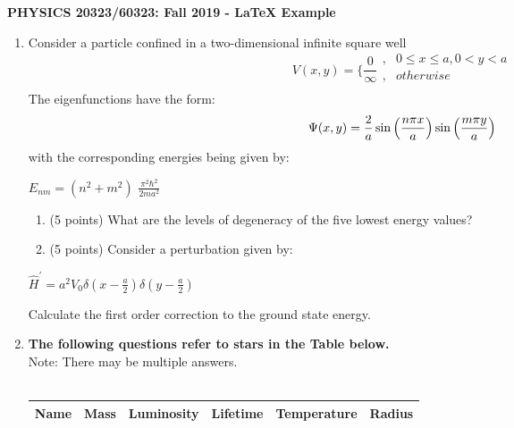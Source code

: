 \documentclass[12pt]{article}
\begin{document}
\def\pos{\medskip\quad}
\def\subpos{\smallskip \qquad}

\begin{center}
{\large\bf
PHYSICS  20323/60323: Fall 2019 - LaTeX Example}\\
\end{center}
\begin{enumerate}
\item {Consider a particle confined in a two-dimensional infinite square well}
\[V(x,y)= \bigg\{ \frac{0}{\infty}\begin{array}{cc}
    , & 0\leq x \leq a   ,   0 < y < a \\ 
   , & otherwise \\
   \end{array}
\]
The eigenfunctions have the form:
\begin{align*}
    \large{\Psi(x,y)= \frac{2}{a}\sin{\left( \frac{n\pi x}{a}\right)}\sin{\left(\frac{m\pi y}{a}\right)}}
\end{align*}
with the corresponding energies being given by:
\begin{center}
     \large{$E_{nm}=(n^{2}+m^{2})$} \Large{$\frac{\pi^{2}\hbar^{2}}{2ma^2}$}
\end{center}
\begin{enumerate}
    \item (5 points) What are the levels of degeneracy of the five lowest energy values?
    \item (5 points) Consider a perturbation given by:
\end{enumerate}
\begin{center}
    \large{$\hat{H}^{\prime}=a^{2}V_{0}\delta\left(x-\frac{a}{2}\right)\delta\left(y-\frac{a}{2}\right)$}
\end{center}
\hspace{0.75cm} Calculate the first order correction to the ground state energy. 
\item {\bf The following questions refer to stars in the Table below.}\\
Note: There may be multiple answers.\\
\\
\begin{tabular}{ |c|c|c|c|c|c| } 
 \hline
 Name & Mass & Luminosity & Lifetime & Temperature & Radius \\ \hline

\end{tabular}
\end{enumerate}
\end{document}
